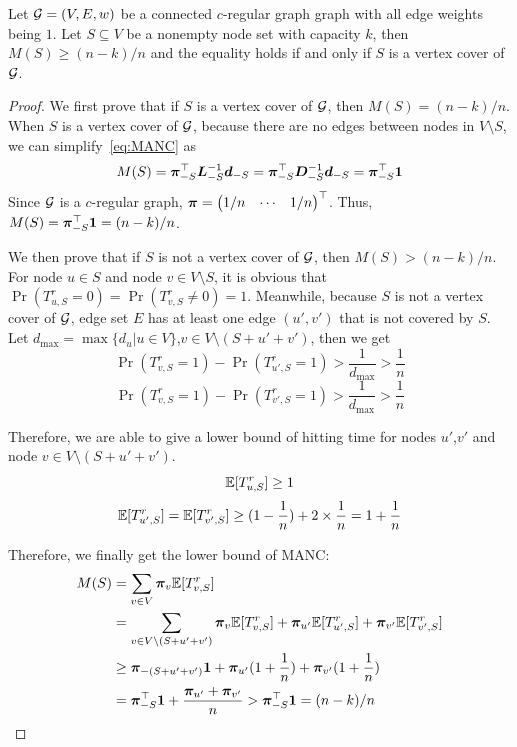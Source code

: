 \documentclass[sigconf]{acmart}
\begin{document}
\begin{lemma}\label{lem:reduct}
    Let \(\mathcal{G}=(V,E,w)\) be a connected \(c\)-regular graph graph with all edge weights being \(1\).
    Let \(S\subseteq V\) be a nonempty node set with capacity \(k\), then \(M(S)\ge (n-k)/n\) and the equality holds if and only if \(S\) is a vertex cover of \(\mathcal{G}\).
\end{lemma}
\begin{proof}
    We first prove that if \(S\) is a vertex cover of \(\mathcal{G}\), then \(M(S)=(n-k)/n\).
    When \(S\) is a vertex cover of \(\mathcal{G}\), because there are no edges between nodes in \(V\setminus S\), we can simplify~\eqref{eq:MANC} as
    \[M(S)=\boldsymbol{\pi}_{-S}^\top\boldsymbol{L}_{-S}^{-1}\boldsymbol{d}_{-S}=\boldsymbol{\pi}_{-S}^\top\boldsymbol{D}_{-S}^{-1}\boldsymbol{d}_{-S}=\boldsymbol{\pi}_{-S}^\top\boldsymbol{1}\]
    Since \(\mathcal{G}\) is a \(c\)-regular graph, \(\boldsymbol{\pi}=\begin{pmatrix}1/n&\cdots&1/n\end{pmatrix}^\top\).
    Thus, \(M(S)=\boldsymbol{\pi}_{-S}^\top\boldsymbol{1}=(n-k)/n\).

    We then prove that if \(S\) is not a vertex cover of \(\mathcal{G}\), then \(M(S)>(n-k)/n\).
    For node \(u\in S\) and node \(v\in V\setminus S\), it is obvious that \(\Pr(T_{u,S}^r=0)=\Pr(T_{v,S}^r\neq0)=1\).
    Meanwhile, because \(S\) is not a vertex cover of \(\mathcal{G}\), edge set \(E\) has at least one edge \((u',v')\) that is not covered by \(S\).
    Let \(d_{\max}=\max\{d_u|u\in V\}\),\(v\in V\setminus(S+u'+v')\), then we get
    \[\Pr(T_{v,S}^r=1)-\Pr(T_{u',S}^r=1)>\frac{1}{d_{\max}}>\frac{1}{n}\]
    \[\Pr(T_{v,S}^r=1)-\Pr(T_{v',S}^r=1)>\frac{1}{d_{\max}}>\frac{1}{n}\]

    Therefore, we are able to give a lower bound of hitting time for nodes \(u'\),\(v'\) and node \(v\in V\setminus(S+u'+v')\).
    \[\mathbb{E}[T_{u,S}^r]\ge1\]
    \[\mathbb{E}[T_{u',S}^r]=\mathbb{E}[T_{v',S}^r]\ge(1-\frac1n)+2\times\frac1n=1+\frac1n\]

    Therefore, we finally get the lower bound of MANC:
    \begin{align*}
        M(S) & =\sum_{v\in V}\boldsymbol{\pi}_v\mathbb{E}[T_{v,S}^r]                                                                             \\
             & =\sum_{v\in V\setminus(S+u'+v')}\boldsymbol{\pi}_v\mathbb{E}[T_{v,S}^r]+\boldsymbol{\pi}_{u'}\mathbb{E}[T_{u',S}^r]+\boldsymbol{\pi}_{v'}\mathbb{E}[T_{v',S}^r] \\
             & \ge\boldsymbol{\pi}_{-(S+u'+v')}\boldsymbol{1}+\boldsymbol{\pi}_{u'}(1+\frac1n)+\boldsymbol{\pi}_{v'}(1+\frac1n)                                        \\
             & =\boldsymbol{\pi}_{-S}^\top\boldsymbol{1}+\frac{\boldsymbol{\pi}_{u'}+\boldsymbol{\pi}_{v'}}n
        >\boldsymbol{\pi}_{-S}^\top\boldsymbol{1}=(n-k)/n
    \end{align*}
\end{proof}
\end{document}
